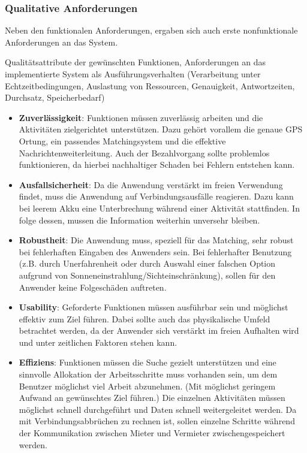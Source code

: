 \newpage 

\subsubsection{Qualitative Anforderungen} 
Neben den funktionalen Anforderungen, ergaben sich auch erste nonfunktionale Anforderungen an das System.


Qualitätsattribute der gewünschten Funktionen,
Anforderungen an das implementierte System als 
Ausführungsverhalten (Verarbeitung unter Echtzeitbedingungen, Auslastung von Ressourcen, Genauigkeit, Antwortzeiten, Durchsatz, Speicherbedarf)

\begin{itemize}
   \item 
   \textbf{Zuverlässigkeit}: Funktionen müssen zuverlässig arbeiten und die Aktivitäten zielgerichtet unterstützen. Dazu gehört vorallem die genaue GPS Ortung, ein passendes Matchingsystem und die effektive Nachrichtenweiterleitung. Auch der Bezahlvorgang sollte problemlos funktionieren, da hierbei nachhaltiger Schaden bei Fehlern entstehen kann. 

   \item
   \textbf{Ausfallsicherheit}: Da die Anwendung verstärkt im freien Verwendung findet, muss die Anwendung auf Verbindungsausfälle reagieren. Dazu kann bei leerem Akku eine Unterbrechung während einer Aktivität stattfinden. In folge dessen, mussen die Information weiterhin unversehr bleiben.

   \item
   \textbf{Robustheit}: Die Anwendung muss, speziell für das Matching, sehr robust bei fehlerhaften Eingaben des Anwenders sein. Bei fehlerhafter Benutzung (z.B. durch Unerfahrenheit oder durch Auswahl einer falschen Option aufgrund von Sonneneinstrahlung/Sichteinschränkung), sollen für den Anwender keine Folgeschäden auftreten.

   \item
   \textbf{Usability}: Geforderte Funktionen müssen ausführbar sein und möglichst effektiv zum Ziel führen. Dabei sollte auch das physikalische Umfeld betrachtet werden, da der Anwender sich verstärkt im freien Aufhalten wird und unter zeitlichen Faktoren stehen kann.
   
   \item 
   \textbf{Effiziens}: Funktionen müssen die Suche gezielt unterstützen und eine sinnvolle Allokation der Arbeitsschritte muss vorhanden sein, um dem Benutzer möglichst viel Arbeit abzunehmen. (Mit möglichst geringem Aufwand an gewünschtes Ziel führen.)
   Die einzelnen Aktivitäten müssen möglichst schnell durchgeführt und Daten schnell weitergeleitet werden. Da mit Verbindungsabbrüchen zu rechnen ist, sollen einzelne Schritte während der Kommunikation zwischen Mieter und Vermieter zwischengespeichert werden.
   

\end{itemize}
